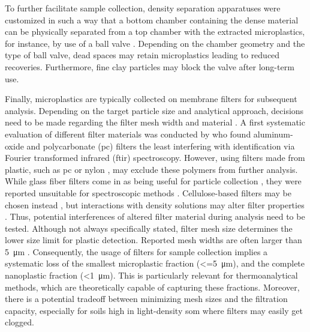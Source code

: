 To further facilitate sample collection, density separation apparatuses were customized in such a way that a bottom chamber containing the dense material can be physically separated from a top chamber with the extracted microplastics, for instance, by use of a ball valve \citep{ImhofNovel2012,ZobkovEvaluation2017,CoppockSmallscale2017,MahatSeparation2017}.
Depending on the chamber geometry and the type of ball valve, dead spaces may retain microplastics leading to reduced recoveries. Furthermore, fine clay particles may block the valve after long-term use.

Finally, microplastics are typically collected on membrane filters for subsequent analysis. Depending on the target particle size and analytical approach, decisions need to be made regarding the filter mesh width and material \citep{MintenigIdentification2017,LoderFocal2015}. A first systematic evaluation of different filter materials was conducted by \citet{LoderFocal2015} who found aluminum-oxide and polycarbonate (\ac{pc}) filters the least interfering with identification via Fourier transformed infrared (\ac{ftir})
spectroscopy. However, using filters made from plastic, such as
\ac{pc} \citep{LoderFocal2015} or nylon \citep{LiuMicroplastic2018}, may exclude these polymers from further analysis. While glass fiber filters come in as being useful for particle collection \citep{HuangAgricultural2020,ChenMixing2020}, they were reported unsuitable for spectroscopic methods \citep{LoderFocal2015}. Cellulose-based filters may be chosen instead \citep{ZhouMicroplastics2020,CorradiniEvidence2019,vandenBergSewage2020},
but interactions with density solutions may alter filter properties \citep{QuinnValidation2017}. Thus, potential interferences of altered filter material during analysis need to be tested. Although not always specifically stated, filter mesh size determines the lower size limit for plastic detection. Reported mesh widths are often larger than \SI{5}{\micro\meter} \citep{HuangAgricultural2020,ZhouMicroplastics2020}. Consequently, the usage of filters for sample collection implies a systematic loss of the smallest microplastic fraction (\SI{<=5}{\micro\meter}), and the complete nanoplastic fraction (\SI{<1}{\micro\meter}). This is particularly relevant for thermoanalytical methods, which are theoretically capable of capturing these fractions. Moreover, there is a potential tradeoff between minimizing mesh sizes and the filtration capacity, especially for soils high in light-density \ac{som} where filters may easily get clogged.

